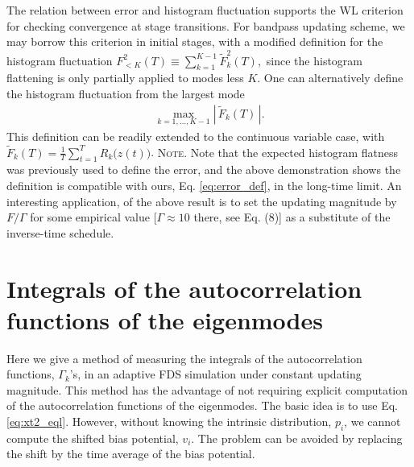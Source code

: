 \documentclass[reprint, superscriptaddress, floatfix]{revtex4-1}
\newcommand{\note}[1]{{\color{DarkGreen}\footnotesize \textsc{Note.} #1}}
\begin{document}
The relation between error and histogram fluctuation
supports the WL criterion for
checking convergence at stage transitions.
%
For bandpass updating scheme,
we may borrow this criterion
in initial stages, with a modified definition
for the histogram fluctuation
$F^2_{<K}(T) \equiv \sum_{k=1}^{K-1} \tilde F_k^2(T),$
since the histogram flattening
is only partially applied to modes less $K$.
%
One can alternatively define the histogram fluctuation
from the largest mode
\begin{align}
  \max_{k=1, \dots, K-1} \left| \, \tilde F_k(T) \, \right|.
  \label{eq:maxFk}
\end{align}
This definition can be readily extended
to the continuous variable case, with
$\tilde F_k(T) = \frac 1 T \sum_{t = 1}^T R_k\bigl( z(t) \bigr)$.
%
\note{
Note that the expected histogram flatness
was previously used to define the error\cite{zhou2005, zhou2008},
and the above demonstration shows the definition
is compatible with ours, Eq. \eqref{eq:error_def}, in the long-time limit.
An interesting application\cite{zhou2008},
of the above result is
to set the updating magnitude by $F/\Gamma$
for some empirical value [$\Gamma \approx 10$ there, see Eq. (8)]
as a substitute of the inverse-time schedule.
}




\section{\label{sec:Gamma_measure}
Integrals of the autocorrelation functions of the eigenmodes
}



Here we give a method of measuring
the integrals of the autocorrelation functions, $\Gamma_k$'s,
in an adaptive FDS simulation
under constant updating magnitude.
%
This method has the advantage of not requiring
explicit computation of
the autocorrelation functions of the eigenmodes.
%
The basic idea is to use Eq. \eqref{eq:xt2_eql}.
%
However,
without knowing the intrinsic distribution, $p_i$,
we cannot compute the shifted bias potential, $v_i$.
%
The problem can be avoided by replacing the shift
by the time average of the bias potential.
\end{document}
